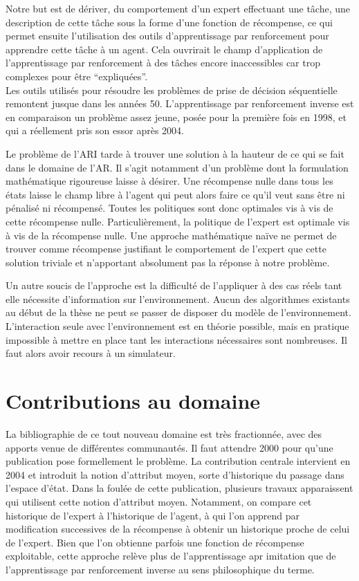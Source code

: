 \documentclass[11pt]{article}
\begin{document}
  Notre but est de dériver, du comportement d'un expert effectuant une tâche, une description de cette tâche sous la forme d'une fonction de récompense, ce qui permet ensuite l'utilisation des outils d'apprentissage par renforcement pour apprendre cette tâche à un agent. Cela ouvrirait le champ d'application de l'apprentissage par renforcement à des tâches encore inaccessibles car trop complexes pour être ``expliquées''.\\

  Les outils utilisés pour résoudre les problèmes de prise de décision séquentielle remontent jusque dans les années 50. L'apprentissage par renforcement inverse est en comparaison un problème assez jeune, posée pour la première fois en 1998, et qui a réellement pris son essor après 2004.

  Le problème de l'ARI tarde à trouver une solution à la hauteur de ce qui se fait dans le domaine de l'AR. Il s'agit notamment d'un problème dont la formulation mathématique rigoureuse laisse à désirer. Une récompense nulle dans tous les états laisse le champ libre à l'agent qui peut alors faire ce qu'il veut sans être ni pénalisé ni récompensé. Toutes les politiques sont donc optimales vis à vis de cette récompense nulle. Particulièrement, la politique de l'expert est optimale vis à vis de la récompense nulle. Une approche mathématique naïve ne permet de trouver comme récompense justifiant le comportement de l'expert que cette solution triviale et n'apportant absolument pas la réponse à notre problème.

  Un autre soucis de l'approche est la difficulté de l'appliquer à des cas réels tant elle nécessite d'information sur l'environnement. Aucun des algorithmes existants au début de la thèse ne peut se passer de disposer du modèle de l'environnement. L'interaction seule avec l'environnement est en théorie possible, mais en pratique impossible à mettre en place tant les interactions nécessaires sont nombreuses. Il faut alors avoir recours à un simulateur.
\section{Contributions au domaine}
\label{sec-3}

  La bibliographie de ce tout nouveau domaine est très fractionnée, avec des apports venue de différentes communautés. Il faut attendre 2000 pour qu'une publication pose formellement le problème. La contribution centrale intervient en 2004 et introduit la notion d'attribut moyen, sorte d'historique du passage dans l'espace d'état. Dans la foulée de cette publication, plusieurs travaux apparaissent qui utilisent cette notion d'attribut moyen. Notamment, on compare cet historique de l'expert à l'historique de l'agent, à qui l'on apprend par modification successives de la récompense à obtenir un historique proche de celui de l'expert. Bien que l'on obtienne parfois une fonction de récompense exploitable, cette approche relève plus de l'apprentissage apr imitation que de l'apprentissage par renforcement inverse au sens philosophique du terme.\\
\end{document}
